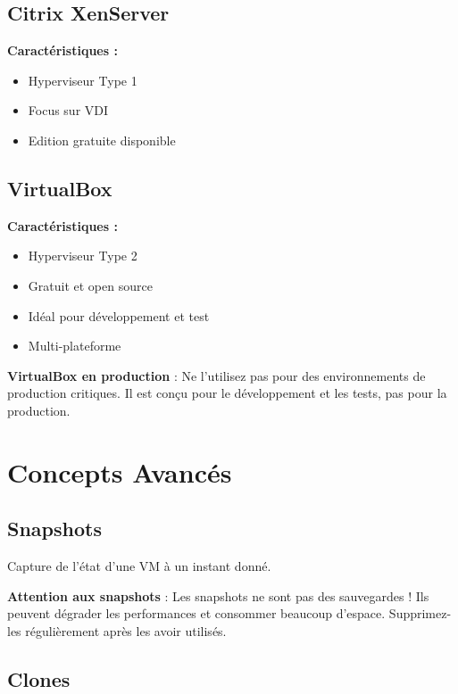 \documentclass[11pt,a4paper]{article}
\begin{document}
\subsection{Citrix XenServer}

\textbf{Caractéristiques :}
\begin{itemize}
    \item Hyperviseur Type 1
    \item Focus sur VDI
    \item Edition gratuite disponible
\end{itemize}

\subsection{VirtualBox}

\textbf{Caractéristiques :}
\begin{itemize}
    \item Hyperviseur Type 2
    \item Gratuit et open source
    \item Idéal pour développement et test
    \item Multi-plateforme
\end{itemize}

\begin{dangerbox}
\textbf{VirtualBox en production} : Ne l'utilisez pas pour des environnements de production critiques. Il est conçu pour le développement et les tests, pas pour la production.
\end{dangerbox}

\section{Concepts Avancés}

\subsection{Snapshots}

Capture de l'état d'une VM à un instant donné.

\begin{importantbox}
\textbf{Attention aux snapshots} : Les snapshots ne sont pas des sauvegardes ! Ils peuvent dégrader les performances et consommer beaucoup d'espace. Supprimez-les régulièrement après les avoir utilisés.
\end{importantbox}

\subsection{Clones}
\end{document}
